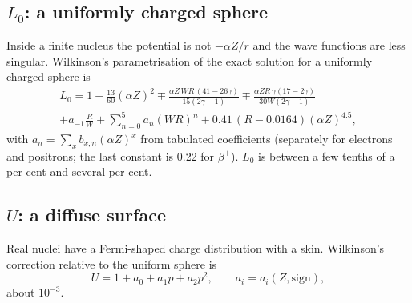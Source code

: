 \subsection{$L_0$: a uniformly charged sphere}
Inside a finite nucleus the potential is not $-\alpha Z/r$ and the wave functions are less singular. Wilkinson's parametrisation \cite{wilkinson} of the exact solution for a uniformly charged sphere is
\begin{multline}
L_0 = 1 + \frac{13}{60}(\alpha Z)^2 \mp \frac{\alpha Z\,W R\,(41-26\gamma)}{15(2\gamma-1)} \mp \frac{\alpha Z R\,\gamma(17-2\gamma)}{30W(2\gamma-1)}\\
+ a_{-1}\frac{R}{W} + \sum_{n=0}^{5} a_n (WR)^n + 0.41\,(R - 0.0164)(\alpha Z)^{4.5},
\end{multline}
with $a_n = \sum_x b_{x,n}(\alpha Z)^x$ from tabulated coefficients (separately for electrons and positrons; the last constant is 0.22 for $\beta^+$). $L_0$ is between a few tenths of a per cent and several per cent.

\subsection{$U$: a diffuse surface}
Real nuclei have a Fermi-shaped charge distribution with a skin. Wilkinson's correction relative to the uniform sphere is
\begin{equation}
U = 1 + a_0 + a_1 p + a_2 p^2, \qquad a_i = a_i(Z, \text{sign}),
\end{equation}
about $10^{-3}$.

